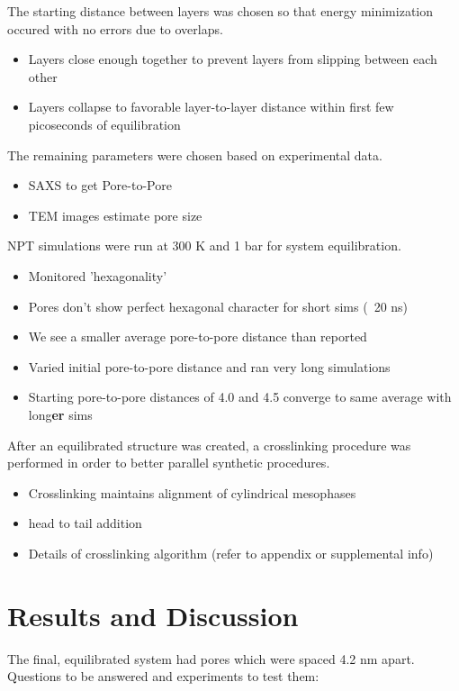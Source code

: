 \documentclass{article}
\begin{document}
	The starting distance between layers was chosen so that energy minimization occured with no errors due to overlaps. 
	\begin{itemize}
		\item Layers close enough together to prevent layers from slipping between each other
		\item Layers collapse to favorable layer-to-layer distance within first few picoseconds of equilibration 
	\end{itemize}
	
	\noindent The remaining parameters were chosen based on experimental data. 
	\begin{itemize}
		\item SAXS to get Pore-to-Pore
		\item TEM images estimate pore size
	\end{itemize}
	
	\noindent NPT simulations were run at 300 K and 1 bar for system equilibration.
	\begin{itemize}
		\item Monitored 'hexagonality'
		\item Pores don't show perfect hexagonal character for short sims (~20 ns) 
		\item We see a smaller average pore-to-pore distance than reported
		\item Varied initial pore-to-pore distance and ran very long simulations
		\item Starting pore-to-pore distances of 4.0 and 4.5 converge to same average with long\textbf{er} sims 
	\end{itemize}
	
	After an equilibrated structure was created, a crosslinking procedure was performed in order to better parallel synthetic procedures. 
	\begin{itemize}
		\item Crosslinking maintains alignment of cylindrical mesophases
		\item head to tail addition
		\item Details of crosslinking algorithm (refer to appendix or supplemental info)
	\end{itemize}  
	
	\section{Results and Discussion}
	
	The final, equilibrated system had pores which were spaced 4.2 nm apart.
	\newline 
	\newline \noindent Questions to be answered and experiments to test them:
	
\end{document}
